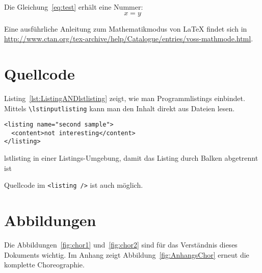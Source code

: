 Die Gleichung~\autoref{eq:test} erhält eine Nummer:
\begin{equation}
\label{eq:test}
x = y
\end{equation}

Eine ausführliche Anleitung zum Mathematikmodus von LaTeX findet sich in \url{http://www.ctan.org/tex-archive/help/Catalogue/entries/voss-mathmode.html}.

\section{Quellcode}
Listing~\autoref{lst:ListingANDlstlisting} zeigt, wie man Programmlistings einbindet.  Mittels \texttt{\textbackslash lstinputlisting} kann man den Inhalt direkt aus Dateien lesen.

\begin{Listing}
\begin{lstlisting}
<listing name="second sample">
  <content>not interesting</content>
</listing>
\end{lstlisting}
\caption{lstlisting in einer Listings-Umgebung, damit das Listing durch Balken abgetrennt ist}
\label{lst:ListingANDlstlisting}
\end{Listing}

Quellcode im \lstinline|<listing />| ist auch möglich.

\section{Abbildungen}
Die Abbildungen~\autoref{fig:chor1} und~\autoref{fig:chor2} sind für das Verständnis dieses Dokuments
wichtig. Im Anhang zeigt Abbildung~\autoref{fig:AnhangsChor} erneut die komplette Choreographie.


